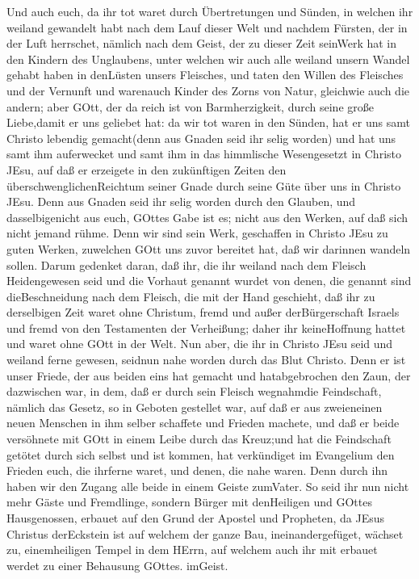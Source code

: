  Und auch euch, da ihr tot waret durch Übertretungen und
Sünden,  in welchen ihr weiland gewandelt habt nach dem Lauf
dieser Welt und nachdem Fürsten, der in der Luft herrschet, nämlich nach
dem Geist, der zu dieser Zeit seinWerk hat in den Kindern des
Unglaubens,  unter welchen wir auch alle weiland unsern
Wandel gehabt haben in denLüsten unsers Fleisches, und taten den Willen
des Fleisches und der Vernunft und warenauch Kinder des Zorns von Natur,
gleichwie auch die andern;  aber GOtt, der da reich ist von
Barmherzigkeit, durch seine große Liebe,damit er uns geliebet hat:
 da wir tot waren in den Sünden, hat er uns samt Christo
lebendig gemacht(denn aus Gnaden seid ihr selig worden)  und
hat uns samt ihm auferwecket und samt ihm in das himmlische Wesengesetzt
in Christo JEsu,  auf daß er erzeigete in den zukünftigen
Zeiten den überschwenglichenReichtum seiner Gnade durch seine Güte über
uns in Christo JEsu.  Denn aus Gnaden seid ihr selig worden
durch den Glauben, und dasselbigenicht aus euch, GOttes Gabe ist es;
 nicht aus den Werken, auf daß sich nicht jemand rühme.
 Denn wir sind sein Werk, geschaffen in Christo JEsu zu
guten Werken, zuwelchen GOtt uns zuvor bereitet hat, daß wir darinnen
wandeln sollen.  Darum gedenket daran, daß ihr, die ihr
weiland nach dem Fleisch Heidengewesen seid und die Vorhaut genannt
wurdet von denen, die genannt sind dieBeschneidung nach dem Fleisch, die
mit der Hand geschieht,  daß ihr zu derselbigen Zeit waret
ohne Christum, fremd und außer derBürgerschaft Israels und fremd von den
Testamenten der Verheißung; daher ihr keineHoffnung hattet und waret
ohne GOtt in der Welt.  Nun aber, die ihr in Christo JEsu
seid und weiland ferne gewesen, seidnun nahe worden durch das Blut
Christo.  Denn er ist unser Friede, der aus beiden eins hat
gemacht und hatabgebrochen den Zaun, der dazwischen war, in dem, daß er
durch sein Fleisch wegnahmdie Feindschaft,  nämlich das
Gesetz, so in Geboten gestellet war, auf daß er aus zweieneinen neuen
Menschen in ihm selber schaffete und Frieden machete,  und
daß er beide versöhnete mit GOtt in einem Leibe durch das Kreuz;und hat
die Feindschaft getötet durch sich selbst  und ist kommen,
hat verkündiget im Evangelium den Frieden euch, die ihrferne waret, und
denen, die nahe waren.  Denn durch ihn haben wir den Zugang
alle beide in einem Geiste zumVater.  So seid ihr nun nicht
mehr Gäste und Fremdlinge, sondern Bürger mit denHeiligen und GOttes
Hausgenossen,  erbauet auf den Grund der Apostel und
Propheten, da JEsus Christus derEckstein ist  auf welchem
der ganze Bau, ineinandergefüget, wächset zu, einemheiligen Tempel in
dem HErrn,  auf welchem auch ihr mit erbauet werdet zu
einer Behausung GOttes. imGeist.

